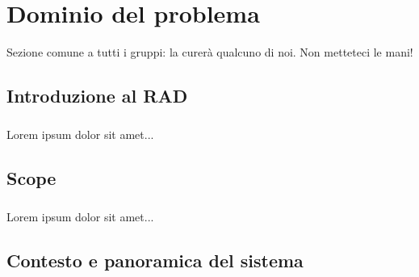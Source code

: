 
\chapter{Dominio del problema}
\label{ref:Introduzione}
Sezione comune a tutti i gruppi: la curerà qualcuno di noi. Non metteteci le mani!

\section{Introduzione al RAD}

\paragraph{}
Lorem ipsum dolor sit amet...

\section{Scope}

\paragraph{}
Lorem ipsum dolor sit amet...

\section{Contesto e panoramica del sistema}

